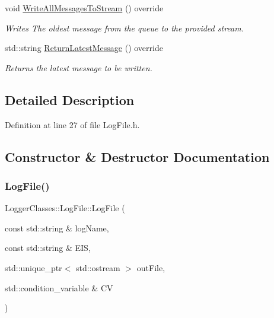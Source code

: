 \begin{DoxyCompactItemize}
void \mbox{\hyperlink{classLoggerClasses_1_1LogFile_a0b87592b5bbe3803b9c09e21351e4288}{Write\+All\+Messages\+To\+Stream}} () override
\begin{DoxyCompactList}\small\item\em Writes The oldest message from the queue to the provided stream. \end{DoxyCompactList}\item 
std\+::string \mbox{\hyperlink{classLoggerClasses_1_1LogFile_a94dc0e9ef181ba4875f8ca3028009c67}{Return\+Latest\+Message}} () override
\begin{DoxyCompactList}\small\item\em Returns the latest message to be written. \end{DoxyCompactList}\end{DoxyCompactItemize}


\subsection{Detailed Description}


Definition at line 27 of file Log\+File.\+h.



\subsection{Constructor \& Destructor Documentation}
\mbox{\label{classLoggerClasses_1_1LogFile_a669d00eff169258e9805677ebee8d539}} 
\subsubsection{\texorpdfstring{LogFile()}{LogFile()}}
{\footnotesize\ttfamily Logger\+Classes\+::\+Log\+File\+::\+Log\+File (\begin{DoxyParamCaption}\item[{const std\+::string \&}]{log\+Name,  }\item[{const std\+::string \&}]{E\+IS,  }\item[{std\+::unique\+\_\+ptr$<$ std\+::ostream $>$}]{out\+File,  }\item[{std\+::condition\+\_\+variable \&}]{CV }\end{DoxyParamCaption})}



